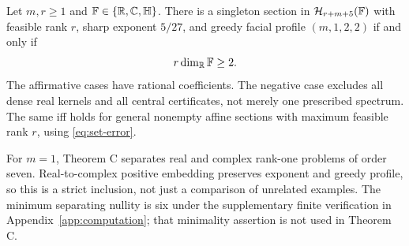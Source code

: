 \begin{theoremC}\label{thm:C}
Let $m,r\ge1$ and $\mathbb F\in\{\mathbb R,\mathbb C,\mathbb H\}$. There is a singleton section in $\mathcal H_{r+m+5}(\mathbb F)$ with feasible rank $r$, sharp exponent $5/27$, and greedy facial profile $(m,1,2,2)$ if and only if
\begin{equation}\label{eq:capacity}
 r\dim_{\mathbb R}\mathbb F\ge2.
\end{equation}
The affirmative cases have rational coefficients. The negative case excludes all dense real kernels and all central certificates, not merely one prescribed spectrum. The same iff holds for general nonempty affine sections with maximum feasible rank $r$, using \eqref{eq:set-error}.
\end{theoremC}

For $m=1$, Theorem C separates real and complex rank-one problems of order seven. Real-to-complex positive embedding preserves exponent and greedy profile, so this is a strict inclusion, not just a comparison of unrelated examples. The minimum separating nullity is six under the supplementary finite verification in Appendix~\ref{app:computation}; that minimality assertion is not used in Theorem C.
